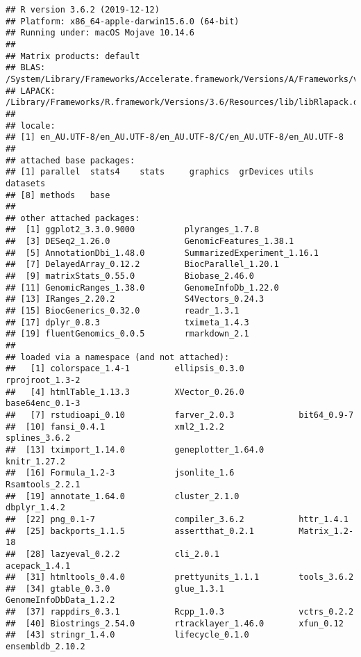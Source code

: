 \documentclass[
]{article}
\begin{document}
\begin{verbatim}
## R version 3.6.2 (2019-12-12)
## Platform: x86_64-apple-darwin15.6.0 (64-bit)
## Running under: macOS Mojave 10.14.6
## 
## Matrix products: default
## BLAS:   /System/Library/Frameworks/Accelerate.framework/Versions/A/Frameworks/vecLib.framework/Versions/A/libBLAS.dylib
## LAPACK: /Library/Frameworks/R.framework/Versions/3.6/Resources/lib/libRlapack.dylib
## 
## locale:
## [1] en_AU.UTF-8/en_AU.UTF-8/en_AU.UTF-8/C/en_AU.UTF-8/en_AU.UTF-8
## 
## attached base packages:
## [1] parallel  stats4    stats     graphics  grDevices utils     datasets 
## [8] methods   base     
## 
## other attached packages:
##  [1] ggplot2_3.3.0.9000          plyranges_1.7.8            
##  [3] DESeq2_1.26.0               GenomicFeatures_1.38.1     
##  [5] AnnotationDbi_1.48.0        SummarizedExperiment_1.16.1
##  [7] DelayedArray_0.12.2         BiocParallel_1.20.1        
##  [9] matrixStats_0.55.0          Biobase_2.46.0             
## [11] GenomicRanges_1.38.0        GenomeInfoDb_1.22.0        
## [13] IRanges_2.20.2              S4Vectors_0.24.3           
## [15] BiocGenerics_0.32.0         readr_1.3.1                
## [17] dplyr_0.8.3                 tximeta_1.4.3              
## [19] fluentGenomics_0.0.5        rmarkdown_2.1              
## 
## loaded via a namespace (and not attached):
##   [1] colorspace_1.4-1         ellipsis_0.3.0           rprojroot_1.3-2         
##   [4] htmlTable_1.13.3         XVector_0.26.0           base64enc_0.1-3         
##   [7] rstudioapi_0.10          farver_2.0.3             bit64_0.9-7             
##  [10] fansi_0.4.1              xml2_1.2.2               splines_3.6.2           
##  [13] tximport_1.14.0          geneplotter_1.64.0       knitr_1.27.2            
##  [16] Formula_1.2-3            jsonlite_1.6             Rsamtools_2.2.1         
##  [19] annotate_1.64.0          cluster_2.1.0            dbplyr_1.4.2            
##  [22] png_0.1-7                compiler_3.6.2           httr_1.4.1              
##  [25] backports_1.1.5          assertthat_0.2.1         Matrix_1.2-18           
##  [28] lazyeval_0.2.2           cli_2.0.1                acepack_1.4.1           
##  [31] htmltools_0.4.0          prettyunits_1.1.1        tools_3.6.2             
##  [34] gtable_0.3.0             glue_1.3.1               GenomeInfoDbData_1.2.2  
##  [37] rappdirs_0.3.1           Rcpp_1.0.3               vctrs_0.2.2             
##  [40] Biostrings_2.54.0        rtracklayer_1.46.0       xfun_0.12               
##  [43] stringr_1.4.0            lifecycle_0.1.0          ensembldb_2.10.2        

\end{verbatim}
\end{document}
